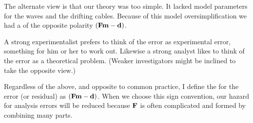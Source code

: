 \par
The alternate view is that our theory was too simple.
It lacked model parameters for the waves and the drifting cables.
Because of this model oversimplification
we had a {\it {}} of the opposite polarity
$(\bold F\bold m-\bold d)$.
\par
A strong experimentalist prefers to think of the error
as experimental error, something for him or her to work out.
Likewise a strong analyst likes to think
of the error as a theoretical problem.
(Weaker investigators might be inclined to take the opposite view.)

\par
Regardless of the above, and opposite to common practice,
I define the  for the error (or residual) as
$(\bold F\bold m-\bold d)$.
When we choose this sign convention,
our hazard for analysis errors will be reduced
because $\bold F$ is often complicated and formed by combining many parts.
\begin{comment}
So in this book
we see positive signs on operators
and we see residuals initialized by the negative of the data,
often with subroutine \texttt{negcopy()}.
\progdex{negcopy}{copy and negate}
\end{comment}
\par
{}
\par

